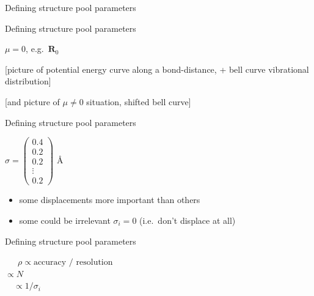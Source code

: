 \documentclass{beamer}
\begin{document}
\begin{frame}{Defining structure pool parameters}
	\begin{center}

	\end{center}
\end{frame}

\begin{frame}{Defining structure pool parameters}
		\begin{center}
	{\huge$\mu=0$, e.g.\ $\textbf{R}_0$}
		\end{center}
	
	[picture of potential energy curve along a bond-distance, + bell curve vibrational distribution]
	
	[and picture of $\mu\neq 0$ situation, shifted bell curve]
\end{frame}

\begin{frame}{Defining structure pool parameters}
		\begin{center}
	$\sigma=\begin{pmatrix}
	0.4 \\
	0.2\\
	0.2\\
	\vdots\\
	0.2
	\end{pmatrix}
	$ \AA
		\end{center}
	
	\begin{itemize}
		\item some displacements more important than others
		\item some could be irrelevant $\sigma_i = 0$ (i.e.\ don't displace at all)
	\end{itemize}

\end{frame}

\begin{frame}{Defining structure pool parameters}
		\begin{center}
	\qquad\qquad\qquad\ \ \ {\huge$\rho\propto\textrm{accuracy / resolution}$}\\
		\vspace{2mm}
	{\huge$\propto N$}\\
		\vspace{2mm}
	\quad\ \ {\huge$\propto 1/\sigma_i$}\\
		\end{center}
\end{frame}
\end{document}
